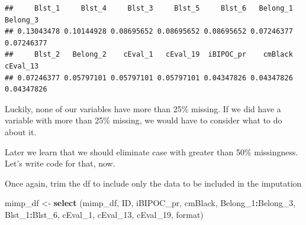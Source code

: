 \documentclass[
  11pt,
]{book}
\newenvironment{Shaded}{\begin{snugshade}}{\end{snugshade}}
\newcommand{\AttributeTok}[1]{\textcolor[rgb]{0.27,0.27,0.27}{#1}}
\newcommand{\CommentTok}[1]{\textcolor[rgb]{0.37,0.37,0.37}{\textit{#1}}}
\newcommand{\DecValTok}[1]{\textcolor[rgb]{0.06,0.06,0.06}{#1}}
\newcommand{\FunctionTok}[1]{\textcolor[rgb]{0.27,0.27,0.27}{\textbf{#1}}}
\newcommand{\NormalTok}[1]{#1}
\newcommand{\OtherTok}[1]{\textcolor[rgb]{0.37,0.37,0.37}{#1}}
\newcommand{\SpecialCharTok}[1]{\textcolor[rgb]{0.43,0.43,0.43}{\textbf{#1}}}
\begin{document}
\begin{verbatim}
##     Blst_1     Blst_4     Blst_3     Blst_5     Blst_6   Belong_1   Belong_3 
## 0.13043478 0.10144928 0.08695652 0.08695652 0.08695652 0.07246377 0.07246377 
##     Blst_2   Belong_2    cEval_1   cEval_19  iBIPOC_pr    cmBlack   cEval_13 
## 0.07246377 0.05797101 0.05797101 0.05797101 0.04347826 0.04347826 0.04347826
\end{verbatim}

Luckily, none of our variables have more than 25\% missing. If we did have a variable with more than 25\% missing, we would have to consider what to do about it.

Later we learn that we should eliminate case with greater than 50\% missingness. Let's write code for that, now.

\begin{Shaded}
\end{Shaded}

Once again, trim the df to include only the data to be included in the imputation

\begin{Shaded}
\begin{Highlighting}[]
\NormalTok{mimp\_df }\OtherTok{\textless{}{-}}  \FunctionTok{select}\NormalTok{ (mimp\_df, ID, iBIPOC\_pr, cmBlack, Belong\_1}\SpecialCharTok{:}\NormalTok{Belong\_3, Blst\_1}\SpecialCharTok{:}\NormalTok{Blst\_6, cEval\_1, cEval\_13, cEval\_19, format)}
\end{Highlighting}
\end{Shaded}
\end{document}
